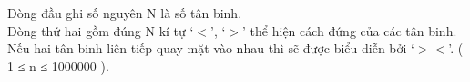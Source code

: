 Dòng đầu ghi số nguyên N là số tân binh.   
\\   Dòng thứ hai gồm đúng N kí tự ‘$<$’, ‘$>$’ thể hiện cách đứng của các tân binh. Nếu hai tân binh liên tiếp quay mặt vào nhau thì sẽ được biểu diễn bởi ‘$>$$<$’. ( 1 ≤ n ≤ 1000000 ).